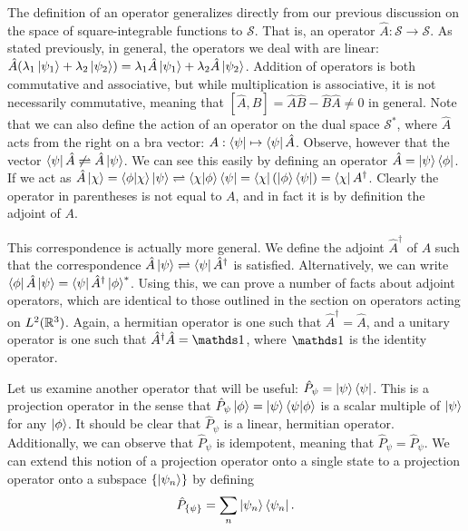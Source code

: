 The definition of an operator generalizes directly from our previous discussion on the space of square-integrable functions to $\mathcal{S}$.
That is, an operator $\hat{A}: \mathcal{S} \rightarrow \mathcal{S}$.
As stated previously, in general, the operators we deal with are linear: $\hat{A} ( \lambda_1 \ket{\psi_1} + \lambda_2 \ket{\psi_2} ) = \lambda_1 \hat{A} \ket{\psi_1} + \lambda_2 \hat{A} \ket{\psi_2}$.
Addition of operators is both commutative and associative, but while multiplication is associative, it is not necessarily commutative, meaning that $[\hat{A},\hat{B}] = \hat{A} \hat{B} - \hat{B} \hat{A} \ne 0$ in general.
Note that we can also define the action of an operator on the dual space $\mathcal{S}^{*}$, where $\hat{A}$ acts from the right on a bra vector: $A: \bra{\psi} \mapsto \bra{\psi} \hat{A}$.
Observe, however that the vector $\bra{\psi} \hat{A} \not\rightleftharpoons \hat{A} \ket{\psi}$.
We can see this easily by defining an operator $\hat{A} = \ket{\psi}\bra{\phi}$.
If we act as $\hat{A} \ket{\chi} = \bra{\phi}\ket{\chi} \ket{\psi} \rightleftharpoons \bra{\chi} \ket{\phi} \bra{\psi} = \bra{\chi} ( \ket{\phi} \bra{\psi} ) = \bra{\chi} A^{\dagger}$.
Clearly the operator in parentheses is not equal to $A$, and in fact it is by definition the adjoint of $A$.

This correspondence is actually more general.
We define the adjoint $\hat{A}^{\dagger}$ of $A$ such that the correspondence $\hat{A} \ket{\psi} \rightleftharpoons \bra{\psi} \hat{A}^{\dagger}$ is satisfied.
Alternatively, we can write $\bra{\phi} \hat{A} \ket{\psi} = \bra{\psi} \hat{A}^{\dagger} \ket{\phi}^{*}$.
Using this, we can prove a number of facts about adjoint operators, which are identical to those outlined in the section on operators acting on $L^2(\mathbb{R}^3)$.
Again, a hermitian operator is one such that $\hat{A}^{\dagger} = \hat{A}$, and a unitary operator is one such that $\hat{A}^{\dagger} \hat{A} = \id$, where $\id$ is the identity operator.

Let us examine another operator that will be useful: $\hat{P}_{\psi} = \ket{\psi}\bra{\psi}$.
This is a projection operator in the sense that $\hat{P}_{\psi} \ket{\phi} = \ket{\psi} \bra{\psi}\ket{\phi}$ is a scalar multiple of $\ket{\psi}$ for any $\ket{\phi}$.
It should be clear that $\hat{P}_{\psi}$ is a linear, hermitian operator.
Additionally, we can observe that $\hat{P}_{\psi}$ is idempotent, meaning that $\hat{P}_{\psi} = \hat{P}_{\psi}$.
We can extend this notion of a projection operator onto a single state to a projection operator onto a subspace $\{ \ket{\psi_{n}} \}$ by defining
\begin{eqnarray}
    \hat{P}_{\{ \psi \}} = \sum_{n} \ket{\psi_{n}} \bra{\psi_{n}}
.\end{eqnarray}

